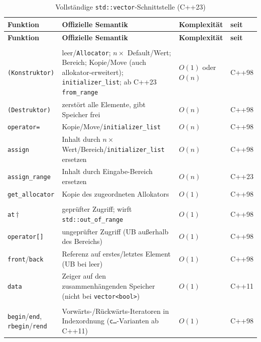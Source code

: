 \begin{longtable}{@{}>{\raggedright\arraybackslash}p{3.1cm} >{\raggedright\arraybackslash}p{5.7cm} >{\raggedright\arraybackslash}p{2.7cm} >{\raggedright\arraybackslash}p{1.1cm}@{}}
  \caption{Vollständige \texttt{std::vector}-Schnittstelle (C++23)}\label{tab:if-vector}\\
  \toprule
  \textbf{Funktion} & \textbf{Offizielle Semantik} & \textbf{Komplexität} & \textbf{seit} \\
  \midrule
\endfirsthead%
  \toprule
  \textbf{Funktion} & \textbf{Offizielle Semantik} & \textbf{Komplexität} & \textbf{seit} \\
  \midrule
\endhead%
  \multicolumn{4}{@{}l}{\textbf{Konstruktion, Zuweisung, Allokator}}\\
  \addlinespace[2pt]
  \texttt{(Konstruktor)} & leer/\texttt{Allocator}; $n\times$ Default/Wert; Bereich; Kopie/Move (auch allokator-erweitert); \texttt{initializer\_list}; ab C++23 \texttt{from\_range} & $O(1)$ oder $O(n)$ & C++98 \\
  \texttt{(Destruktor)} & zerstört alle Elemente, gibt Speicher frei & $O(n)$ & C++98 \\
  \texttt{operator=} & Kopie/Move/\texttt{initializer\_list} & $O(n)$ & C++98 \\
  \texttt{assign} & Inhalt durch $n\times$ Wert/\allowbreak{}Bereich/\allowbreak{}\texttt{initializer\_\allowbreak{}list} ersetzen & $O(n)$ & C++98 \\
  \texttt{assign\_range} & Inhalt durch Eingabe-Bereich ersetzen & $O(n)$ & C++23 \\
  \texttt{get\_allocator} & Kopie des zugeordneten Allokators & $O(1)$ & C++98 \\
  \addlinespace[3pt]
  \multicolumn{4}{@{}l}{\textbf{Elementzugriff}}\\
  \addlinespace[2pt]
  \texttt{at}\,$\dagger$ & geprüfter Zugriff; wirft \texttt{std::out\_of\_range} & $O(1)$ & C++98 \\
  \texttt{operator[]} & ungeprüfter Zugriff (UB außerhalb des Bereichs) & $O(1)$ & C++98 \\
  \texttt{front}/\texttt{back} & Referenz auf erstes/letztes Element (UB bei leer) & $O(1)$ & C++98 \\
  \texttt{data} & Zeiger auf den zusammenhängenden Speicher (nicht bei \texttt{vector<bool>}) & $O(1)$ & C++11 \\
  \addlinespace[3pt]
  \multicolumn{4}{@{}l}{\textbf{Iteratoren}}\\
  \addlinespace[2pt]
  \texttt{begin}/\texttt{end}, \texttt{rbegin}/\texttt{rend} & Vorwärts-/Rückwärts-Iteratoren in Indexordnung (\texttt{c…}-Varianten ab C++11) & $O(1)$ & C++98 \\

\end{longtable}
